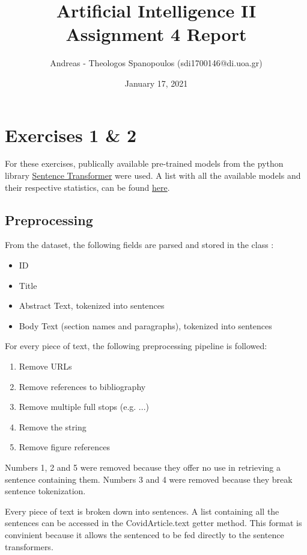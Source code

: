 \documentclass[12pt]{report}
\title{Artificial Intelligence II \\ Assignment 4 Report}
\author{Andreas - Theologos Spanopoulos (sdi1700146@di.uoa.gr)}
\date{January 17, 2021}
\begin{document}
\maketitle

\section*{Exercises 1 \& 2}
For these exercises, publically available pre-trained models from the python library
\href{https://www.sbert.net/index.html}{Sentence Transformer} were used. A list with
all the available models and their respective statistics, can be found
\href{https://docs.google.com/spreadsheets/d/14QplCdTCDwEmTqrn1LH4yrbKvdogK4oQvYO1K1aPR5M/edit#gid=0}
{here}.

\subsection*{Preprocessing}
From the dataset, the following fields are parsed and stored in the class :
\begin{itemize}
    \item ID
    \item Title
    \item Abstract Text, tokenized into sentences
    \item Body Text (section names and paragraphs), tokenized into sentences
\end{itemize}
For every piece of text, the following preprocessing pipeline is followed:
\begin{enumerate}
    \item Remove URLs
    \item Remove references to bibliography
    \item Remove multiple full stops (e.g. ...)
    \item Remove the  string
    \item Remove figure references
\end{enumerate}
Numbers 1, 2 and 5 were removed because they offer no use in retrieving a sentence containing them.
Numbers 3 and 4 were removed because they break sentence tokenization.
\bigskip

\noindent Every piece of text is broken down into sentences. A list containing all the sentences can be
accessed in the CovidArticle.text getter method. This format is convinient because it allows the
sentenced to be fed directly to the sentence transformers. \clearpage
\end{document}

